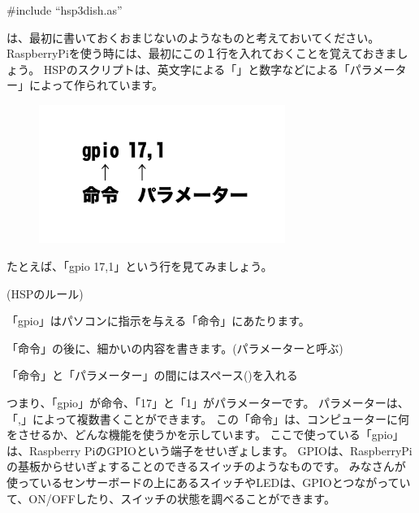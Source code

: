 \begin{description}
    \item \#include “hsp3dish.as”
\end{description}

\noindent
は、最初に書いておくおまじないのようなものと考えておいてください。
RaspberryPiを使う時には、最初にこの１行を入れておくことを覚えておきましょう。
HSPのスクリプトは、英文字による「」と数字などによる「パラメーター」によって作られています。

\begin{figure}[H]
    \begin{center}
        \includegraphics[keepaspectratio,width=8.017cm,height=4.512cm]{text02-img/text02-img024.png}
    \end{center}
\end{figure}

たとえば、「gpio 17,1」という行を見てみましょう。

\begin{description}
    \item (HSPのルール)
\end{description}

\begin{description}
    \item 「gpio」はパソコンに指示を与える「命令」にあたります。
    \item 「命令」の後に、細かいの内容を書きます。(パラメーターと呼ぶ)
    \item 「命令」と「パラメーター」の間にはスペース()を入れる
\end{description}
\noindent
つまり、「gpio」が命令、「17」と「1」がパラメーターです。
パラメーターは、「,」によって複数書くことができます。
この「命令」は、コンピューターに何をさせるか、どんな機能を使うかを示しています。
ここで使っている「gpio」は、Raspberry PiのGPIOという端子をせいぎょします。
GPIOは、RaspberryPiの基板からせいぎょすることのできるスイッチのようなものです。
みなさんが使っているセンサーボードの上にあるスイッチやLEDは、GPIOとつながっていて、ON/OFFしたり、スイッチの状態を調べることができます。

